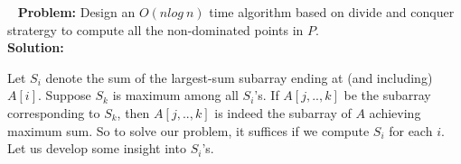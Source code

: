 \documentclass[11pt]{article}
\newcommand{\handout}[5]{
  \noindent
  \begin{center}
  \framebox{
    \vbox{
      \hbox to 5.78in { {\bfseries Assignment One, Problem One} }
      \vspace{4mm}
      \hbox to 5.78in { {\Large \hfill #5  \hfill} }
      \vspace{2mm}
      \hbox to 5.78in { {\em #3 \hfill #4} }
    }
  }
  \end{center}
  \vspace*{4mm}
}
\newcommand{\lecture}[4]{\handout{#1}{#2}{#3}{}{#1}}
\begin{document}
~\vspace*{-.5cm}
{\bf Problem:} Design an $O(nlog\ n)$ time algorithm based on divide and conquer
stratergy to compute all the non-dominated points in $P$.\\


\noindent
{\bf Solution:}

Let $S_i$ denote the sum of the largest-sum subarray ending at (and including)
$A[i]$. Suppose $S_k$ is maximum among all $S_i$'s. If $A[j,..,k]$ be the
subarray corresponding to $S_k$, then $A[j,..,k]$ is indeed the subarray of
$A$ achieving maximum sum. So to solve our problem, it suffices if
we compute $S_i$ for each $i$. Let us develop some insight into $S_i$'s.
\end{document}
